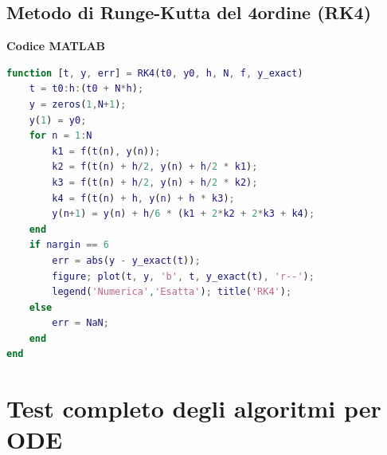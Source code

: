 \documentclass[12pt,a4paper]{article}
\begin{document}
\begin{flushleft}
\newpage

\section*{Metodo di Runge-Kutta del 4\textdegree ordine (RK4)}


\vspace{1em}
\textbf{Codice MATLAB}
\begin{lstlisting}[language=Matlab]
function [t, y, err] = RK4(t0, y0, h, N, f, y_exact)
    t = t0:h:(t0 + N*h);
    y = zeros(1,N+1);
    y(1) = y0;
    for n = 1:N
        k1 = f(t(n), y(n));
        k2 = f(t(n) + h/2, y(n) + h/2 * k1);
        k3 = f(t(n) + h/2, y(n) + h/2 * k2);
        k4 = f(t(n) + h, y(n) + h * k3);
        y(n+1) = y(n) + h/6 * (k1 + 2*k2 + 2*k3 + k4);
    end
    if nargin == 6
        err = abs(y - y_exact(t));
        figure; plot(t, y, 'b', t, y_exact(t), 'r--');
        legend('Numerica','Esatta'); title('RK4');
    else
        err = NaN;
    end
end
\end{lstlisting}


\end{flushleft}


\newpage
\section*{Test completo degli algoritmi per ODE}
\end{document}
